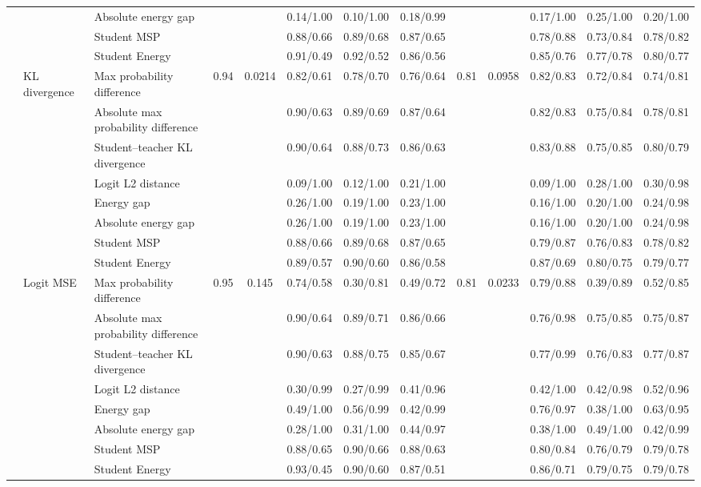 \documentclass[border=2pt]{standalone}
\begin{document}
\begin{tabular}{lllcccccccccc}
 &  & Absolute energy gap &  &  & 0.14/1.00 & 0.10/1.00 & 0.18/0.99 &  &  & 0.17/1.00 & 0.25/1.00 & 0.20/1.00 \\
 &  & Student MSP &  &  & 0.88/0.66 & 0.89/0.68 & 0.87/0.65 &  &  & 0.78/0.88 & 0.73/0.84 & 0.78/0.82 \\
 &  & Student Energy &  &  & 0.91/0.49 & 0.92/0.52 & 0.86/0.56 &  &  & 0.85/0.76 & 0.77/0.78 & 0.80/0.77 \\
\addlinespace
 & KL divergence & Max probability difference & 0.94 & 0.0214 & 0.82/0.61 & 0.78/0.70 & 0.76/0.64 & 0.81 & 0.0958 & 0.82/0.83 & 0.72/0.84 & 0.74/0.81 \\
 &  & Absolute max probability difference &  &  & 0.90/0.63 & 0.89/0.69 & 0.87/0.64 &  &  & 0.82/0.83 & 0.75/0.84 & 0.78/0.81 \\
 &  & Student--teacher KL divergence &  &  & 0.90/0.64 & 0.88/0.73 & 0.86/0.63 &  &  & 0.83/0.88 & 0.75/0.85 & 0.80/0.79 \\
 &  & Logit L2 distance &  &  & 0.09/1.00 & 0.12/1.00 & 0.21/1.00 &  &  & 0.09/1.00 & 0.28/1.00 & 0.30/0.98 \\
 &  & Energy gap &  &  & 0.26/1.00 & 0.19/1.00 & 0.23/1.00 &  &  & 0.16/1.00 & 0.20/1.00 & 0.24/0.98 \\
 &  & Absolute energy gap &  &  & 0.26/1.00 & 0.19/1.00 & 0.23/1.00 &  &  & 0.16/1.00 & 0.20/1.00 & 0.24/0.98 \\
 &  & Student MSP &  &  & 0.88/0.66 & 0.89/0.68 & 0.87/0.65 &  &  & 0.79/0.87 & 0.76/0.83 & 0.78/0.82 \\
 &  & Student Energy &  &  & 0.89/0.57 & 0.90/0.60 & 0.86/0.58 &  &  & 0.87/0.69 & 0.80/0.75 & 0.79/0.77 \\
\addlinespace
 & Logit MSE & Max probability difference & 0.95 & 0.145 & 0.74/0.58 & 0.30/0.81 & 0.49/0.72 & 0.81 & 0.0233 & 0.79/0.88 & 0.39/0.89 & 0.52/0.85 \\
 &  & Absolute max probability difference &  &  & 0.90/0.64 & 0.89/0.71 & 0.86/0.66 &  &  & 0.76/0.98 & 0.75/0.85 & 0.75/0.87 \\
 &  & Student--teacher KL divergence &  &  & 0.90/0.63 & 0.88/0.75 & 0.85/0.67 &  &  & 0.77/0.99 & 0.76/0.83 & 0.77/0.87 \\
 &  & Logit L2 distance &  &  & 0.30/0.99 & 0.27/0.99 & 0.41/0.96 &  &  & 0.42/1.00 & 0.42/0.98 & 0.52/0.96 \\
 &  & Energy gap &  &  & 0.49/1.00 & 0.56/0.99 & 0.42/0.99 &  &  & 0.76/0.97 & 0.38/1.00 & 0.63/0.95 \\
 &  & Absolute energy gap &  &  & 0.28/1.00 & 0.31/1.00 & 0.44/0.97 &  &  & 0.38/1.00 & 0.49/1.00 & 0.42/0.99 \\
 &  & Student MSP &  &  & 0.88/0.65 & 0.90/0.66 & 0.88/0.63 &  &  & 0.80/0.84 & 0.76/0.79 & 0.79/0.78 \\
 &  & Student Energy &  &  & 0.93/0.45 & 0.90/0.60 & 0.87/0.51 &  &  & 0.86/0.71 & 0.79/0.75 & 0.79/0.78 \\
\bottomrule
\end{tabular}
\end{document}
